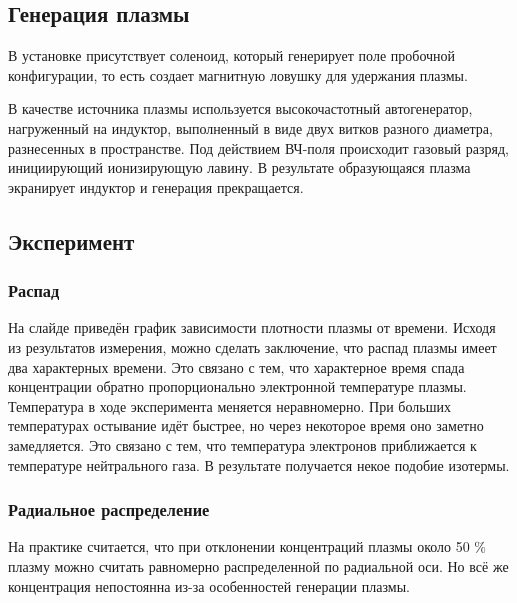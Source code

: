 \subsection{Генерация плазмы} %
В установке присутствует соленоид, который генерирует поле пробочной конфигурации, то есть создает магнитную ловушку для удержания плазмы.

В качестве источника плазмы используется высокочастотный автогенератор, нагруженный на индуктор, выполненный в виде двух витков разного диаметра, разнесенных в пространстве. Под действием ВЧ-поля происходит газовый разряд, инициирующий ионизирующую лавину. В результате образующаяся плазма экранирует индуктор и генерация прекращается.  


\subsection{Эксперимент} %
\subsubsection{Распад}

На слайде приведён график зависимости плотности плазмы от времени. Исходя из результатов измерения, можно сделать заключение, что  распад плазмы имеет два характерных времени. Это связано с тем, что характерное время спада концентрации обратно пропорционально электронной температуре плазмы.
Температура в ходе эксперимента меняется неравномерно.
При больших температурах остывание идёт быстрее, но через некоторое время оно заметно замедляется. Это связано с тем, что температура электронов приближается к температуре нейтрального газа. В результате получается некое подобие изотермы. 



\subsubsection{Радиальное распределение}
На практике считается, что  при отклонении концентраций плазмы около 50 \% плазму можно считать равномерно распределенной по радиальной оси. 
Но всё же концентрация непостоянна из-за особенностей генерации плазмы.
 
  

